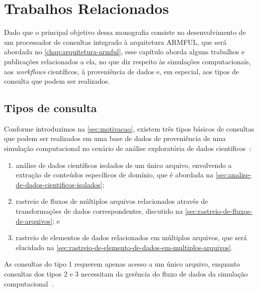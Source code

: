
\chapter{Trabalhos Relacionados}%
\label{chap:trabalhos-relacionados}

Dado que o principal objetivo dessa monografia consiste no desenvolvimento de um processador de consultas integrado à arquitetura ARMFUL, que será abordada no \autoref{chap:arquitetura-armful}, esse capítulo aborda alguns trabalhos e publicações relacionados a ela, no que diz respeito às simulações computacionais, aos \textit{workflows} científicos, à proveniência de dados e, em especial, aos tipos de consulta que podem ser realizados.

\section{Tipos de consulta}%
\label{sec:tipos-de-consulta}

Conforme introduzimos na \autoref{sec:motivacao}, existem três tipos básicos de consultas que podem ser realizados em uma base de dados de proveniência de uma simulação computacional no cenário de análise exploratória de dados científicos~\cite{silva2015analyzing,silva2015propostadoutorado}:

\begin{enumerate}
    \item análise de dados científicos isolados de um único arquivo, envolvendo a extração de conteúdos específicos de domínio, que é abordada na \autoref{sec:analise-de-dados-cientificos-isolados};
    \item rastreio de fluxos de múltiplos arquivos relacionados através de transformações de dados correspondentes, discutido na \autoref{sec:rastreio-de-fluxos-de-arquivos}; e
    \item rastreio de elementos de dados relacionados em múltiplos arquivos, que será elucidado na \autoref{sec:rastreio-de-elemento-de-dados-em-multiplos-arquivos}.
\end{enumerate}

As consultas do tipo 1 requerem apenas acesso a um único arquivo, enquanto consultas dos tipos 2 e 3 necessitam da gerência do fluxo de dados da simulação computacional~\cite{silva2015analyzing}.


